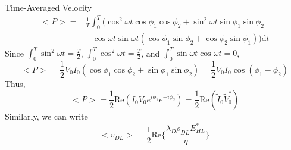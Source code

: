 \documentclass[11pt]{beamer}
\begin{document}
\begin{frame}{Time-Averaged Velocity}
    \[
        \begin{aligned}
            <P>=&\frac{1}{T}\int_0^T(\cos^2{\omega t}\cos{\phi_1}\cos{\phi_2}+\sin^2{\omega t}\sin{\phi_1}\sin{\phi_2}\\
            &-\cos{\omega t}\sin{\omega t}(\cos{\phi_1}\sin{\phi_2}+\cos{\phi_2}\sin{\phi_1}))\mathrm{d}t
        \end{aligned}
    \]
    Since $\int_0^T{\sin^2{\omega t}}=\frac{T}{2}$, $\int_0^T{\cos^2{\omega t}}=\frac{T}{2}$, and $\int_0^T{\sin{\omega t}\cos{\omega t}}=0$,\\
    \[<P>=\frac{1}{2}V_0I_0\left(\cos{\phi_1}\cos{\phi_2}+\sin{\phi_1}\sin{\phi_2}\right)=\frac{1}{2}V_0I_0\cos{(\phi_1-\phi_2)}\]
    Thus,
    \[<P>=\frac{1}{2}\mathrm{Re}\left(I_0V_0e^{i\phi_1}e^{-i\phi_2}\right)=\frac{1}{2}\mathrm{Re}\left(\tilde{I}_0\tilde{V}_0^*\right)\]
    Similarly, we can write
    \[<v_{DL}>=\frac{1}{2}\mathrm{Re}\{\frac{\lambda_D\rho_{DL}E_{HL}^*}{\eta}\}\]
\end{frame}
\end{document}

